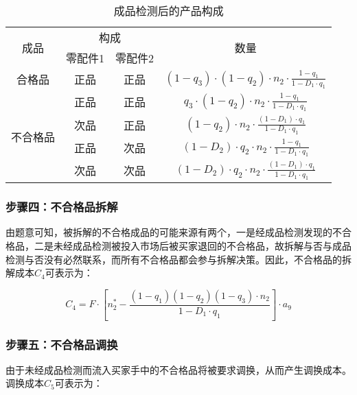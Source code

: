 \documentclass[withoutpreface,bwprint]{cumcmthesis} %
\begin{document}
\begin{table}[htbp]
				\centering
								\caption{成品检测后的产品构成}
	\begin{tabular}{cccc}		
		\toprule[1.5pt]
		\multirow{2}{*}{成品}   & \multicolumn{2}{c}{构成} & \multirow{2}{*}{数量} \\ \cline{2-3}
		& 零配件1       & 零配件2      &                     \\ \hline
		合格品                   & 正品         & 正品        & $(1-q_ 3) \cdot(1-q _2) \cdot n _2 \cdot \frac{1-q _1}{1-D _1 \cdot q _1}$                   \\\hline
		\multirow{4}{*}{不合格品} & 正品         & 正品        & $q _3 \cdot(1-q _2) \cdot n_ 2 \cdot \frac{1-q_ 1}{1-D_ 1 \cdot q _1}$                   \\
		& 次品         & 正品        & $(1-q_ 2) \cdot n _2 \cdot \frac{(1-D _1) \cdot q _1}{1-D_ 1 \cdot q_ 1}$                  \\
		& 正品         & 次品        & $(1-D_ 2) \cdot q _2 \cdot n _2 \cdot \frac{1-q _1}{1-D _1 \cdot q _1}$                   \\
		& 次品         & 次品        & $(1-D_ 2) \cdot q _2 \cdot n _2 \cdot \frac{(1-D _1) \cdot q_ 1}{1-D _1 \cdot q_ 1}$                   \\ \bottomrule[1.5pt]
	\end{tabular}
\end{table}

\subsubsection*{步骤四：不合格品拆解}

由题意可知，被拆解的不合格成品的可能来源有两个，一是经成品检测发现的不合格品，二是未经成品检测被投入市场后被买家退回的不合格品，故拆解与否与成品检测与否没有必然联系，而所有不合格品都会参与拆解决策。因此，不合格品的拆解成本$C_4$可表示为：

\begin{equation}
    C_4 = F \cdot [n_2^* - \frac{(1 - q_1)(1 - q_2)(1 - q_3) \cdot n_2}{1 - D_1 \cdot q_1}]\cdot a_9
\end{equation}

\subsubsection*{步骤五：不合格品调换}
由于未经成品检测而流入买家手中的不合格品将被要求调换，从而产生调换成本。调换成本$C_5$可表示为：
\end{document}
